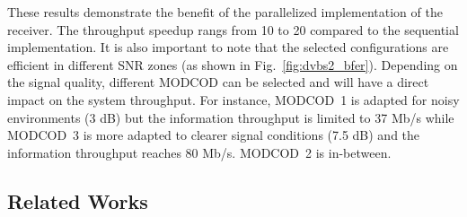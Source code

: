 These results demonstrate the benefit of the parallelized implementation of the
receiver. The throughput speedup rangs from 10 to 20 compared to the sequential
implementation. It is also important to note that the selected configurations
are efficient in different SNR zones (as shown in Fig.~\ref{fig:dvbs2_bfer}).
Depending on the signal quality, different MODCOD can be selected and will have
a direct impact on the system throughput. For instance, MODCOD~1 is adapted for
noisy environments (3 dB) but the information throughput is limited to 37 Mb/s
while MODCOD~3 is more adapted to clearer signal conditions (7.5 dB) and the
information throughput reaches 80 Mb/s. MODCOD~2 is in-between.

\subsection{Related Works}


